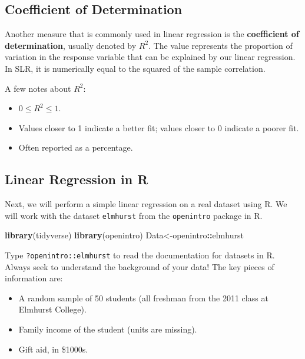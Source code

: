 \documentclass[
]{book}
\newenvironment{Shaded}{\begin{snugshade}}{\end{snugshade}}
\newcommand{\FunctionTok}[1]{\textcolor[rgb]{0.13,0.29,0.53}{\textbf{#1}}}
\newcommand{\NormalTok}[1]{#1}
\newcommand{\OtherTok}[1]{\textcolor[rgb]{0.56,0.35,0.01}{#1}}
\newcommand{\SpecialCharTok}[1]{\textcolor[rgb]{0.81,0.36,0.00}{\textbf{#1}}}
\providecommand{\tightlist}{%
  \setlength{\itemsep}{0pt}\setlength{\parskip}{0pt}}
\begin{document}
\subsection{Coefficient of Determination}\label{coefficient-of-determination}

Another measure that is commonly used in linear regression is the \textbf{coefficient of determination}, usually denoted by \(R^2\). The value represents the proportion of variation in the response variable that can be explained by our linear regression. In SLR, it is numerically equal to the squared of the sample correlation.

A few notes about \(R^2\):

\begin{itemize}
\tightlist
\item
  \(0 \leq R^2 \leq 1\).
\item
  Values closer to 1 indicate a better fit; values closer to 0 indicate a poorer fit.
\item
  Often reported as a percentage.
\end{itemize}

\subsection{Linear Regression in R}\label{linear-regression-in-r}

Next, we will perform a simple linear regression on a real dataset using R. We will work with the dataset \texttt{elmhurst} from the \texttt{openintro} package in R.

\begin{Shaded}
\begin{Highlighting}[]
\FunctionTok{library}\NormalTok{(tidyverse)}
\FunctionTok{library}\NormalTok{(openintro)}
\NormalTok{Data}\OtherTok{\textless{}{-}}\NormalTok{openintro}\SpecialCharTok{::}\NormalTok{elmhurst}
\end{Highlighting}
\end{Shaded}

Type \texttt{?openintro::elmhurst} to read the documentation for datasets in R. Always seek to understand the background of your data! The key pieces of information are:

\begin{itemize}
\tightlist
\item
  A random sample of 50 students (all freshman from the 2011 class at Elmhurst College).
\item
  Family income of the student (units are missing).
\item
  Gift aid, in \$1000s.
\end{itemize}
\end{document}
